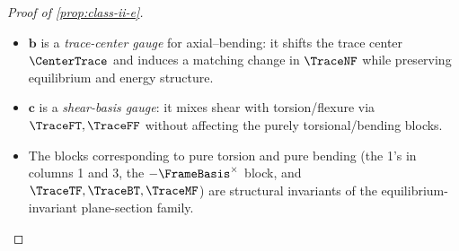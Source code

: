 \begin{proof}[Proof of \cref{prop:class-ii-e}]
\begin{itemize}
  \item \(\bm{b}\) is a \emph{trace-center gauge} for axial–bending:
        it shifts the trace center \(\CenterTrace\) and induces a
        matching change in \(\TraceNF\) while preserving equilibrium and
        energy structure.
  \item \(\bm{c}\) is a \emph{shear-basis gauge}: it mixes shear with
        torsion/flexure via \(\TraceFT,\TraceFF\) without affecting the
        purely torsional/bending blocks.
  \item The blocks corresponding to pure torsion and pure bending
        (the 1’s in columns 1 and 3, the \(-\FrameBasis^\times\) block,
        and \(\TraceTF,\TraceBT,\TraceMF\)) are structural invariants of
        the equilibrium-invariant plane-section family.
\end{itemize}
\end{proof}